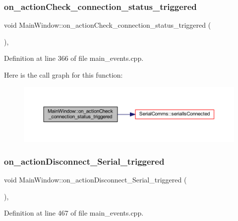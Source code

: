 \subsubsection{\texorpdfstring{on\_actionCheck\_connection\_status\_triggered}{on\_actionCheck\_connection\_status\_triggered}}
{\footnotesize\ttfamily void Main\+Window\+::on\+\_\+action\+Check\+\_\+connection\+\_\+status\+\_\+triggered (\begin{DoxyParamCaption}{ }\end{DoxyParamCaption})\hspace{0.3cm}{\ttfamily [private]}, {\ttfamily [slot]}}



Definition at line 366 of file main\+\_\+events.\+cpp.

Here is the call graph for this function\+:
\nopagebreak
\begin{figure}[H]
\begin{center}
\leavevmode
\includegraphics[width=350pt]{class_main_window_aa6925b9f63240473ebb0baeb0caf51d5_cgraph}
\end{center}
\end{figure}
\mbox{\label{class_main_window_adac02082b520624b82e63d66eb2f1f57}} 
\subsubsection{\texorpdfstring{on\_actionDisconnect\_Serial\_triggered}{on\_actionDisconnect\_Serial\_triggered}}
{\footnotesize\ttfamily void Main\+Window\+::on\+\_\+action\+Disconnect\+\_\+\+Serial\+\_\+triggered (\begin{DoxyParamCaption}{ }\end{DoxyParamCaption})\hspace{0.3cm}{\ttfamily [private]}, {\ttfamily [slot]}}



Definition at line 467 of file main\+\_\+events.\+cpp.

